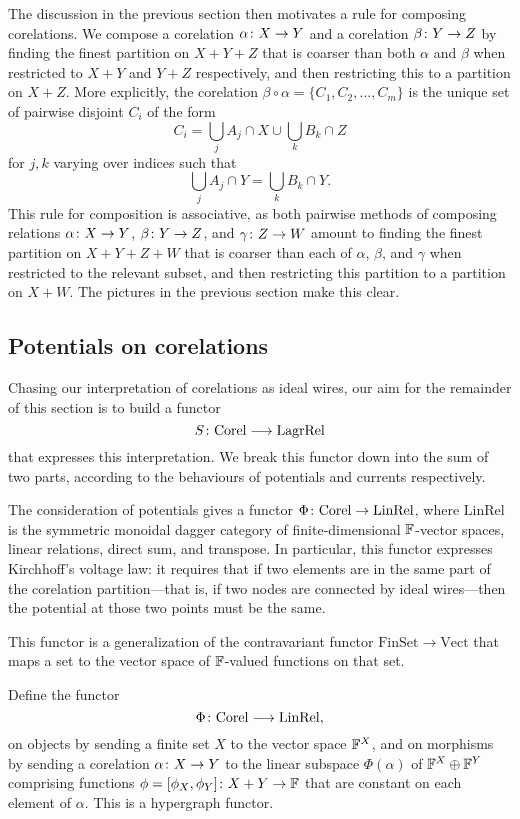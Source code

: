 The discussion in the previous section then motivates a rule for composing corelations. We compose a corelation $\alpha {\colon} X \to Y$ and a corelation $\beta {\colon} Y \to Z$ by finding the finest partition on $X+Y+Z$ that is coarser than both $\alpha$ and $\beta$ when restricted to $X+Y$ and $Y+Z$ respectively, and then restricting this to a
partition on $X+Z$. More explicitly, the corelation $\beta\circ\alpha = \{C_1,
C_2, \dots, C_m\}$ is the unique set of pairwise disjoint $C_i$ of the form 
\[
  C_i = \bigcup_j A_j \cap X \cup \bigcup_k B_k \cap Z
\]
for $j,k$ varying over indices such that 
\[
  \bigcup_j A_j \cap Y = \bigcup_k B_k \cap Y.
\]
This rule for composition is associative, as both pairwise methods of composing relations
$\alpha{\colon} X \to Y$, $\beta{\colon} Y \to Z$, and $\gamma{\colon} Z \to W$ amount to finding the finest partition on $X+Y+Z+W$ that is coarser than each of $\alpha$, $\beta$, and $\gamma$ when restricted to the relevant subset, and then restricting this
partition to a partition on $X+W$.  The pictures in the previous section make this clear.

\subsection{Potentials on corelations} \label{ssec:potentialsoncorelations}

Chasing our interpretation of corelations as ideal wires, our aim for the
remainder of this section is to build a functor
\[
  S{\colon} \mathrm{Corel} \longrightarrow \mathrm{LagrRel}
\]
that expresses this interpretation. We break this functor down into the sum 
of two parts, according to the behaviours of potentials and currents
respectively. 

The consideration of potentials gives a functor $\Phi{\colon} \mathrm{Corel}
\to \mathrm{LinRel}$, where $\mathrm{LinRel}$ is the symmetric
monoidal dagger category of finite-dimensional ${\mathbb F}$-vector spaces, linear
relations, direct sum, and transpose. In particular, this functor expresses
Kirchhoff's voltage law: it requires that if two elements are in the same part
of the corelation partition---that is, if two nodes are connected by ideal
wires---then the potential at those two points must be the same.

This functor is a generalization of the
contravariant functor $\mathrm{FinSet} \to \mathrm{Vect}$ that maps a set to the
vector space of ${\mathbb F}$-valued functions on that set.

\begin{proposition}
  Define the functor 
  \[ 
    \Phi{\colon} \mathrm{Corel} \longrightarrow \mathrm{LinRel}, 
  \] 
  on objects by sending a finite set $X$ to the vector space ${\mathbb F}^X$, and on
  morphisms by sending a corelation $\alpha{\colon} X \to Y$ to the linear subspace
  $\Phi(\alpha)$ of ${\mathbb F}^X \oplus {\mathbb F}^Y$ comprising functions $\phi =
  [\phi_X,\phi_Y]{\colon} X+Y \to {\mathbb F}$ that are constant on each element of
  $\alpha$.  This is a hypergraph functor.
\end{proposition}

